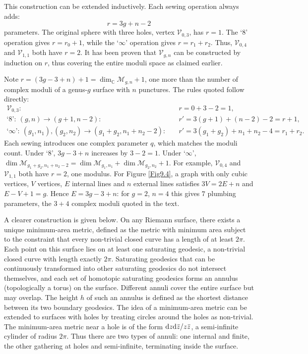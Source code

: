This construction can be extended inductively. Each sewing operation always adds:
\begin{equation}
	r = 3g + n - 2  \label{9.3.8}
\end{equation}
parameters.
The original sphere with three holes, vertex $\mathscr{V}_{0,3}$, has $r=1$. The `8' operation gives $r=r_{0}+1$, while the `$\infty$' operation gives $r=r_{1}+r_{2}$. 
Thus, $\mathscr{V}_{0,4}$ and $\mathscr{V}_{1,1}$ both have $r=2$. It has been proven that $\mathscr{V}_{g, n}$ can be constructed by induction on $r$, 
thus covering the entire moduli space as claimed earlier.
\begin{tcolorbox}[breakable]
	\begin{remark}
		Note $r=(3g-3+n)+1=\dim_{\mathbb C}\mathscr M_{g,n}+1$, one more than the number of complex moduli of a genus-$g$ surface with $n$ punctures. The rules quoted follow directly:
		\begin{align*}
			\mathscr V_{0,3}:&\quad r=0+3-2=1,\\
			\text{`8'}:\ (g,n)\to(g+1,n-2):&\quad r'=3(g+1)+(n-2)-2=r+1,\\
			\text{`}\infty\text{'}:\ (g_1,n_1),(g_2,n_2)\to(g_1+g_2,n_1+n_2-2):&\quad r'=3(g_1+g_2)+n_1+n_2-4=r_1+r_2 .
		\end{align*}
		Each sewing introduces one complex parameter $q$, which matches the moduli count. Under `8', $3g-3+n$ increases by $3-2=1$. Under `$\infty$', $\dim\mathscr M_{g_1+g_2,n_1+n_2-2}=\dim\mathscr M_{g_1,n_1}+\dim\mathscr M_{g_2,n_2}+1$. For example, $\mathscr V_{0,4}$ and $\mathscr V_{1,1}$ both have $r=2$, one modulus. For Figure \ref{Fig9.4}, a graph with only cubic vertices, $V$ vertices, $E$ internal lines and $n$ external lines satisfies $3V=2E+n$ and $E-V+1=g$. Hence $E=3g-3+n$: for $g=2$, $n=4$ this gives $7$ plumbing parameters, the $3+4$ complex moduli quoted in the text.
	\end{remark}
\end{tcolorbox}
A clearer construction is given below. On any Riemann surface, there exists a unique minimum-area metric, defined as the metric with minimum area subject to the constraint that every non-trivial closed curve has a length of at least $2\pi$. 
Each point on this surface lies on at least one saturating geodesic, a non-trivial closed curve with length exactly $2\pi$. 
Saturating geodesics that can be continuously transformed into other saturating geodesics do not intersect themselves, and each set of homotopic saturating geodesics forms an annulus (topologically a torus) on the surface. 
Different annuli cover the entire surface but may overlap. The height $h$ of such an annulus is defined as the shortest distance between its two boundary geodesics. The idea of a minimum-area metric can be extended to surfaces with holes 
by treating circles around the holes as non-trivial.
The minimum-area metric near a hole is of the form $\mathrm{d} z \mathrm{d} \bar{z} / z \bar{z}$, a semi-infinite cylinder of radius $2\pi$. 
Thus there are two types of annuli: one internal and finite, the other gathering at holes and semi-infinite, terminating inside the surface.

